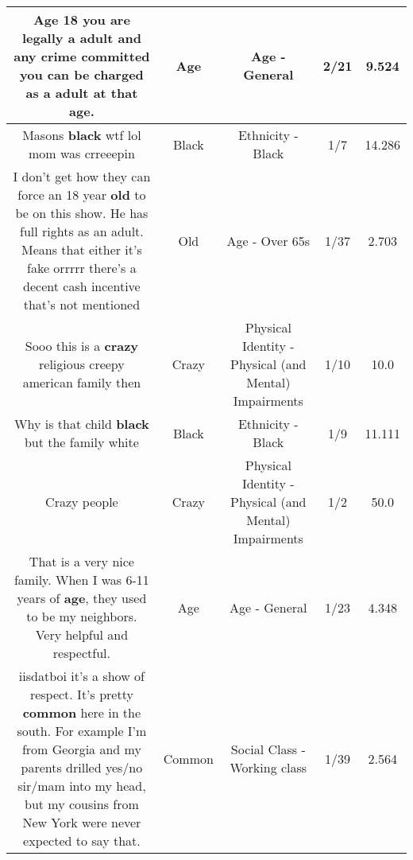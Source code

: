 \documentclass[11pt]{article}
\newlength\mylength
\begin{document}
\begin{center}
\begin{longtable}{|C{.65\mylength}|C{.30\mylength}|C{.12\mylength}|C{.12\mylength}|C{.12\mylength}|}
  \small Age 18 you are legally a adult and any crime committed you can be charged as a adult at that \textbf{age}.\normalsize   & Age & Age - General & 2/21 & 9.524 \\  \hline
  \small Masons \textbf{black} wtf lol mom was crreeepin\normalsize   & Black & Ethnicity - Black & 1/7 & 14.286 \\  \hline
  \small I don't get how they can force an 18 year \textbf{old} to be on this show. He has full rights as an adult. Means that either it's fake orrrrr there's a decent cash incentive that's not mentioned\normalsize   & Old & Age - Over 65s & 1/37 & 2.703 \\  \hline
  \small Sooo this is a \textbf{crazy} religious creepy american family then\normalsize   & Crazy & Physical Identity - Physical (and Mental) Impairments & 1/10 & 10.0 \\  \hline
  \small Why is that child \textbf{black} but the family white\normalsize   & Black & Ethnicity - Black & 1/9 & 11.111 \\  \hline
  \small Crazy people\normalsize   & Crazy & Physical Identity - Physical (and Mental) Impairments & 1/2 & 50.0 \\  \hline
  \small That is a very nice family. When I was 6-11 years of \textbf{age}, they used to be my neighbors. Very helpful and respectful.\normalsize   & Age & Age - General & 1/23 & 4.348 \\  \hline
  \small iisdatboi it's a show of respect. It's pretty \textbf{common} here in the south. For example I'm from Georgia and my parents drilled yes/no sir/mam into my head, but my cousins from New York were never expected to say that.\normalsize   & Common & Social Class - Working class & 1/39 & 2.564 \\  \hline

\end{longtable}
\end{center}
\end{document}

